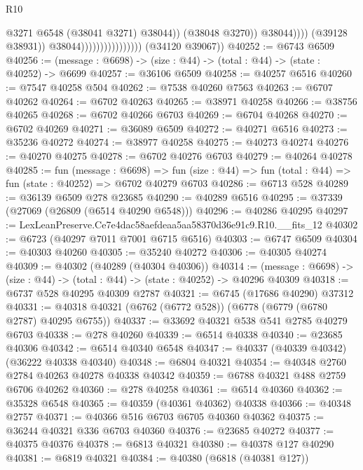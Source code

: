 \begin{lexlean}{R10}
\begin{coremodule}
                                                      @3271
                                                      @6548
                                                      (@38041 @3271)
                                                      @38044))
                                                  (@38048 @3270))
                                                @38044))))
                                        (@39128 @38931))
                                      @38044))))))))))))))))
      (@34120 @39067))
@40252 := @6743 @6509
@40256 := (message : @6698) -> (size : @44) -> (total : @44) -> (state : @40252) -> @6699
@40257 := @36106 @6509
@40258 := @40257 @6516
@40260 := @7547 @40258 @504
@40262 := @7538 @40260 @7563
@40263 := @6707 @40262
@40264 := @6702 @40263
@40265 := @38971 @40258
@40266 := @38756 @40265
@40268 := @6702 @40266 @6703
@40269 := @6704 @40268
@40270 := @6702 @40269
@40271 := @36089 @6509
@40272 := @40271 @6516
@40273 := @35236 @40272
@40274 := @38977 @40258
@40275 := @40273 @40274
@40276 := @40270 @40275
@40278 := @6702 @40276 @6703
@40279 := @40264 @40278
@40285 := fun (message : @6698) =>
  fun (size : @44) => fun (total : @44) => fun (state : @40252) => @6702 @40279 @6703
@40286 := @6713 @528
@40289 := @36139 @6509 @278 @23685
@40290 := @40289 @6516
@40295 := @37339 (@27069 (@26809 (@6514 @40290 @6548)))
@40296 := @40286 @40295
@40297 := LexLeanPreserve.Ce7e4dac58aefdeaa5aa58370d36e91c9.R10.__fits_12
@40302 := @6723 (@40297 @7011 @7001 @6715 @6516)
@40303 := @6747 @6509
@40304 := @40303 @40260
@40305 := @35240 @40272
@40306 := @40305 @40274
@40309 := @40302 (@40289 (@40304 @40306))
@40314 := (message : @6698) -> (size : @44) -> (total : @44) -> (state : @40252) -> @40296 @40309
@40318 := @6737 @528 @40295 @40309 @2787
@40321 := @6745 (@17686 @40290) @37312
@40331 := @40318 @40321 (@6762 (@6772 @528)) (@6778 (@6779 (@6780 @2787) @40295 @6755))
@40337 := @33692 @40321 @538 @541 @2785 @40279 @6703
@40338 := @278 @40260
@40339 := @6514 @40338
@40340 := @23685 @40306
@40342 := @6514 @40340 @6548
@40347 := @40337 (@40339 @40342) (@36222 @40338 @40340)
@40348 := @6804 @40321
@40354 := @40348 @2760 @2784 @40263 @40278 @40338 @40342
@40359 := @6788 @40321 @488 @2759 @6706 @40262
@40360 := @278 @40258
@40361 := @6514 @40360
@40362 := @35328 @6548
@40365 := @40359 (@40361 @40362) @40338
@40366 := @40348 @2757
@40371 := @40366 @516 @6703 @6705 @40360 @40362
@40375 := @36244 @40321 @336 @6703 @40360
@40376 := @23685 @40272
@40377 := @40375 @40376
@40378 := @6813 @40321
@40380 := @40378 @127 @40290
@40381 := @6819 @40321
@40384 := @40380 (@6818 (@40381 @127))

\end{coremodule}
\end{lexlean}
